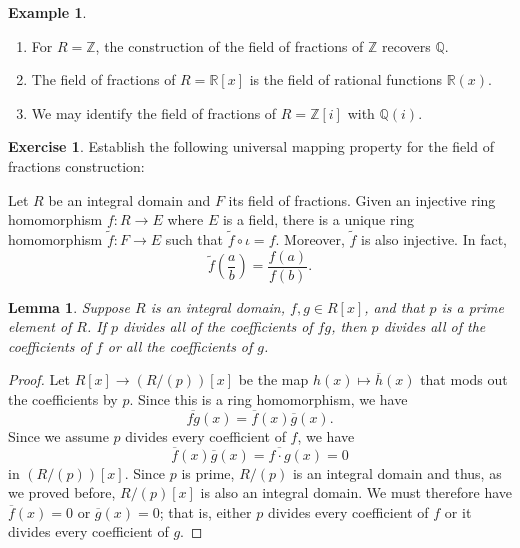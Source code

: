 \documentclass[12pt]{report}
\newtheorem{lemma}[theorem]{Lemma}
\numberwithin{equation}{section}
\numberwithin{theorem}{chapter}
\theoremstyle{definition}
\newtheorem{example}[theorem]{Example}
\newtheorem{exercise}{Exercise}
\newtheorem*{basic properties}{Basic Properties}
\newtheorem*{Important Remark}{Important Remark}
\begin{document}
\begin{example} 
\begin{enumerate}
\item  For $R = \mathbb{Z}$, the construction of the field of fractions of $\mathbb{Z}$ recovers $\mathbb{Q}$.

\item The field of fractions of $R = \mathbb{R}[x]$ is the field of rational functions $\mathbb{R}(x)$.

\item We may identify the field of fractions of $R = \mathbb{Z}[i]$ with $\mathbb{Q}(i)$.
\end{enumerate}
\end{example}


\begin{exercise} 
Establish the following universal mapping property for the field of fractions construction: 

Let $R$ be an integral domain and $F$ its field of fractions. Given an injective ring homomorphism $f\!: R \to E$ where $E$ is a field, there is a unique ring homomorphism $\tilde{f}: F \to E$ such that $\tilde{f} \circ \iota = f$. Moreover, $\tilde{f}$ is also injective. In fact, 
$$\tilde{f} \left( \frac{a}{b} \right) = \frac{f(a)}{f(b)}.$$	
\end{exercise}


\begin{lemma}\label{lemma to prove Gauss}
Suppose $R$ is an integral domain, $f, g \in R[x]$, and that $p$ is a prime element of $R$. If $p$ divides all of the coefficients of $fg$, then $p$ divides all of the coefficients of $f$ or all the coefficients of $g$.
\end{lemma}


\begin{proof} 
Let $R[x] \to (R/(p))[x]$ be the map $h(x) \mapsto \overline{h}(x)$ that mods out the coefficients by $p$. 
Since this is a ring homomorphism, we have 
$$\overline{f g}(x) = \overline{f}(x) \overline{g}(x).$$ 
Since we assume $p$ divides every coefficient of $f$, we have
$$\overline{f}(x) \overline{g}(x)= \overline{f \cdot g}(x) =  0$$
in $(R/(p))[x]$. Since $p$ is prime, $R/(p)$ is an integral domain and thus, as we proved before, $R/(p)[x]$ is also an integral domain.
We must therefore have $\overline{f}(x) = 0$ or $\overline{g}(x) = 0$; that is, either $p$ divides every coefficient of $f$ or it divides every coefficient of $g$.
\end{proof}
\end{document}
